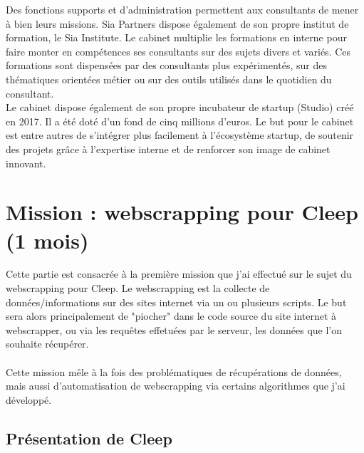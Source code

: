 \documentclass{article} %
\begin{document}
Des fonctions supports et d’administration permettent aux consultants de mener à bien leurs missions. Sia Partners dispose également de son propre institut de formation, le Sia Institute. Le cabinet multiplie les formations en interne pour faire monter en compétences ses consultants sur des sujets divers et variés. Ces formations sont dispensées par des consultants plus expérimentés, sur des thématiques orientées métier ou sur des outils utilisés dans le quotidien du consultant. \\

Le cabinet dispose également de son propre incubateur de startup (Studio) créé en 2017. Il a été doté d’un fond de cinq millions d’euros. Le but pour le cabinet est entre autres de s’intégrer plus facilement à l’écosystème startup, de soutenir des projets grâce à l’expertise interne et de renforcer son image de cabinet innovant. 



\newpage

\section{Mission : webscrapping pour Cleep (1 mois)}
Cette partie est consacrée à la première mission que j'ai effectué sur le sujet du webscrapping pour Cleep. Le webscrapping est la collecte de données/informations sur des sites internet via un ou plusieurs scripts. Le but sera alors principalement de "piocher" dans le code source du site internet à webscrapper, ou via les requêtes effetuées par le serveur, les données que l'on souhaite récupérer.\\ \\
Cette mission mêle à la fois des problématiques de récupérations de données, mais aussi d'automatisation de webscrapping via certains algorithmes que j'ai développé.

\subsection{Présentation de Cleep}
\end{document}
